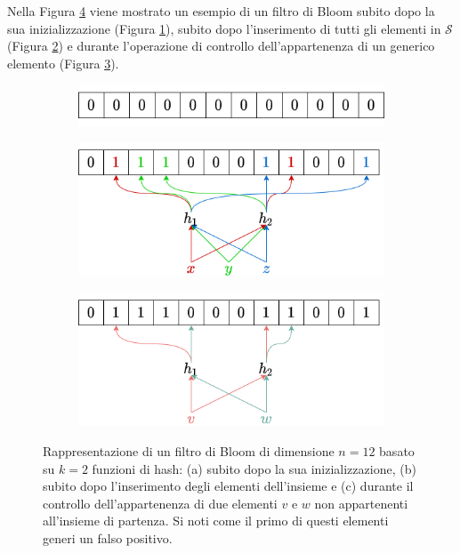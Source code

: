 \documentclass[../../main.tex]{subfiles}
\begin{document}
Nella Figura \ref{fig:BFExample} viene mostrato un esempio di un filtro di Bloom subito dopo la sua inizializzazione (Figura \ref{fig:BFCreazione}), subito dopo l'inserimento di tutti gli elementi in $\mathcal{S}$ (Figura \ref{fig:BF:Inizializzazione}) e durante l'operazione di controllo dell'appartenenza di un generico elemento (Figura \ref{fig:BFAppartenenza}).

\begin{figure}[H]
    \centering
    \begin{subfigure}[b]{0.70\textwidth}
       \includegraphics[width=1\linewidth]{immagini/3/bloomFilterInitial .png}
       \caption{}
       \label{fig:BFCreazione} 
    \end{subfigure}
    
    \begin{subfigure}[b]{0.70\textwidth}
       \includegraphics[width=1\linewidth]{immagini/3/bloomFilterInserimento.png}
       \caption{}
       \label{fig:BF:Inizializzazione}
    \end{subfigure}
 
    \begin{subfigure}[b]{0.70\textwidth}
        \includegraphics[width=1\linewidth]{immagini/3/bloomFilterCheck.png}
        \caption{}
        \label{fig:BFAppartenenza}
     \end{subfigure}
    \caption{Rappresentazione di un filtro di Bloom di dimensione $n=12$ basato su $k=2$ funzioni di hash: (a) subito dopo la sua inizializzazione, (b)  subito dopo l'inserimento degli elementi dell'insieme e (c) durante il controllo dell'appartenenza di due elementi $v$ e $w$ non appartenenti all'insieme di partenza. Si noti come il primo di questi elementi generi un falso positivo.}
    \label{fig:BFExample}
\end{figure}
\end{document}
